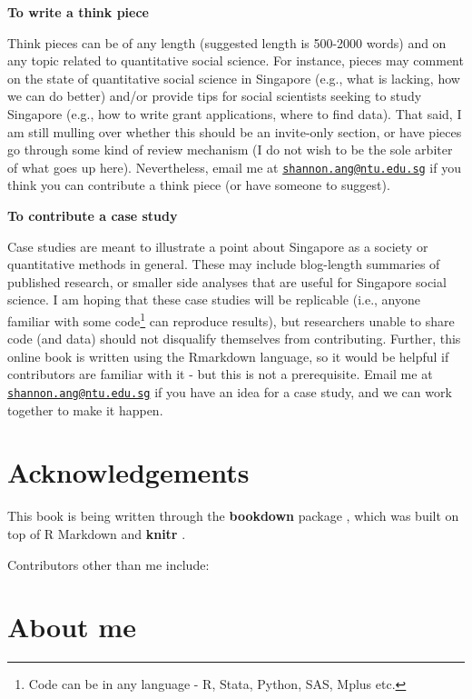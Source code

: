 \documentclass[openany]{book}
\let\rmarkdownfootnote\footnote%
\def\footnote{\protect\rmarkdownfootnote}
\begin{document}
\textbf{To write a think piece}

Think pieces can be of any length (suggested length is 500-2000 words)
and on any topic related to quantitative social science. For instance,
pieces may comment on the state of quantitative social science in
Singapore (e.g., what is lacking, how we can do better) and/or provide
tips for social scientists seeking to study Singapore (e.g., how to
write grant applications, where to find data). That said, I am still
mulling over whether this should be an invite-only section, or have
pieces go through some kind of review mechanism (I do not wish to be the
sole arbiter of what goes up here). Nevertheless, email me at
\href{mailto:shannon.ang@ntu.edu.sg}{\nolinkurl{shannon.ang@ntu.edu.sg}}
if you think you can contribute a think piece (or have someone to
suggest).

\textbf{To contribute a case study}

Case studies are meant to illustrate a point about Singapore as a
society or quantitative methods in general. These may include
blog-length summaries of published research, or smaller side analyses
that are useful for Singapore social science. I am hoping that these
case studies will be replicable (i.e., anyone familiar with some
code\footnote{Code can be in any language - R, Stata, Python, SAS, Mplus
  etc.} can reproduce results), but researchers unable to share code
(and data) should not disqualify themselves from contributing. Further,
this online book is written using the Rmarkdown language, so it would be
helpful if contributors are familiar with it - but this is not a
prerequisite. Email me at
\href{mailto:shannon.ang@ntu.edu.sg}{\nolinkurl{shannon.ang@ntu.edu.sg}}
if you have an idea for a case study, and we can work together to make
it happen.

\section*{Acknowledgements}\label{acknowledgements}

This book is being written through the \textbf{bookdown} package
\citep{R-bookdown}, which was built on top of R Markdown and
\textbf{knitr} \citep{xie2015}.

Contributors other than me include:

\section*{About me}\label{about-me}
\end{document}
